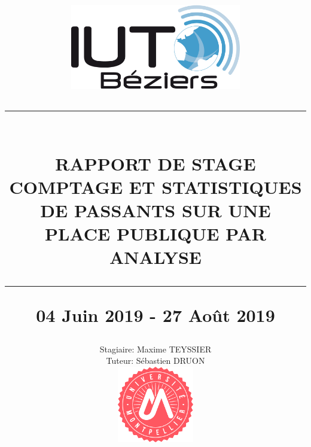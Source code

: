 \documentclass[12pt, french]{report}
\newcommand{\HRule}[1]{\rule{\linewidth}{#1}}
\begin{document}
\pagestyle{fancy}
\fancyhf{}
\setlength\headheight{15pt}


\title{\includegraphics[width=0.56\textwidth]{Images/IUT-Beziers.png}\\
		\normalsize\textsc{}
		\HRule{2pt} \\
        \LARGE \textbf{\uppercase{Rapport de stage\\Comptage et statistiques de passants sur une place publique par analyse}}
		\HRule{2pt} 
		\normalsize 04 Juin 2019 - 27 Août 2019 \vspace*{3\baselineskip}
        }
\author{Stagiaire: Maxime TEYSSIER\\Tuteur: Sébastien DRUON\\ 
        \includegraphics[width=0.25\textwidth]{Images/UM.png}
        \date{}\\
        }
\maketitle
\clearpage
\newpage
\strut
\thispagestyle{empty}
\newpage
\thispagestyle{empty}							      
\end{document}
